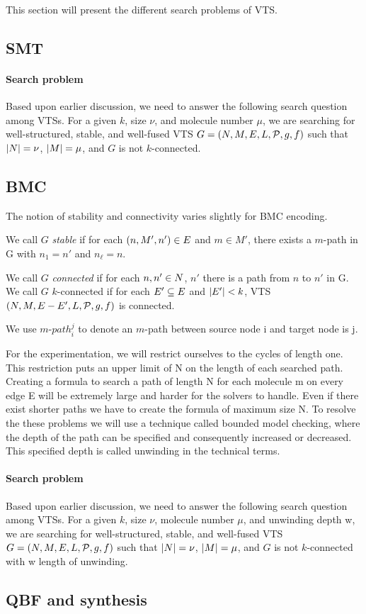 This section will present the different search problems of VTS.

\subsection{SMT}

\paragraph{Search problem}
Based upon earlier discussion, we need to answer the following search
question among VTSs.
For a given $k$, size $\nu$, and molecule number $\mu$,
we are searching for well-structured, stable, and well-fused VTS
$G = (N,M,E,L,\mathcal{P},g,f)$ such that
$|N| = \nu$, $|M| = \mu$, and
$G$ is not $k$-connected.    


\subsection{BMC}
The notion of stability and connectivity varies slightly for BMC encoding. 

%
We call $G$ {\em stable} if for each $(n,M',n') \in E$ and $m \in M'$,
there exists a $m$-path in G with $n_1 = n'$ and $n_\ell = n$.
%

%
We call $G$ {\em connected} if for each $n,n' \in N$,
$n'$ there is a path from $n$ to $n'$ in G.
%
We call $G$ $k$-connected if for each $E' \subseteq E$ and $|E'| < k$,
VTS $(N,M,E-E',L,\mathcal{P},g,f)$ is connected.
%

We use $m$-${path}_i^j$ to denote an $m$-path between source node i and target node is j. 

For the experimentation, we will restrict ourselves to the cycles of length one. 
%
This restriction puts an upper limit of N on the length of each searched path. 
%
Creating a formula to search a path of length N for each molecule m on every edge E will be extremely large and harder for the solvers to handle.  
%
Even if there exist shorter paths we have to create the formula of maximum size N. 
% 
To resolve the these problems we will use a technique called bounded model checking, where the depth of the path can be specified and consequently increased or decreased.  
%
This specified depth is called unwinding in the technical terms.

\paragraph{Search problem}
Based upon earlier discussion, we need to answer the following search
question among VTSs.
For a given $k$, size $\nu$, molecule number $\mu$, and unwinding depth w,
we are searching for well-structured, stable, and well-fused VTS
$G = (N,M,E,L,\mathcal{P},g,f)$ such that
$|N| = \nu$, $|M| = \mu$, and $G$ is not $k$-connected with w length of unwinding.    

\subsection{QBF and synthesis}



             

